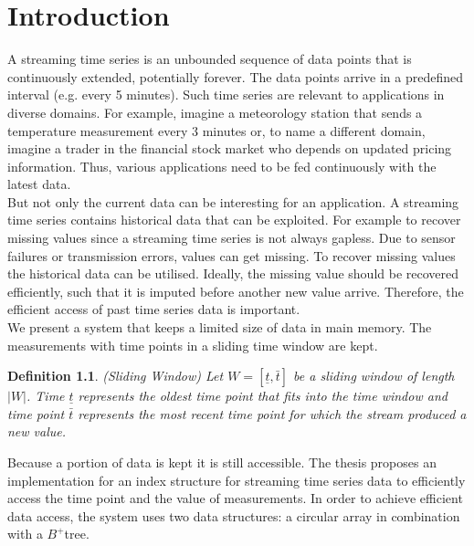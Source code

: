 \documentclass[abstracton,12pt,oneside]{scrreprt}
\begin{document}
\tableofcontents
\listoffigures
\listoftables
\listofalgorithms
\renewcommand{\lstlistingname}{Algorithm}%
\renewcommand{\listtablename}{Tables}


\newtheorem{defn}{Definition}
\newtheorem{exmp}{Example}[section]
\newcommand*{\argmin}{\operatornamewithlimits{argmin}\limits}

\chapter{Introduction}
A streaming time series is an unbounded sequence of data points that is continuously extended, potentially forever. The data points arrive in a predefined interval (e.g. every 5 minutes). Such time series are relevant to applications in diverse domains. For example, imagine a meteorology station that sends a temperature measurement every 3 minutes or, to name a different domain, imagine a trader in the financial stock market who depends on updated pricing information. Thus, various applications need to be fed continuously with the latest data. \\
But not only the current data can be interesting for an application. A streaming time series contains historical data that can be exploited. For example to recover missing values since a streaming time series is not always gapless. Due to sensor failures or transmission errors, values can get missing. To recover missing values the historical data can be utilised. Ideally, the missing value should be recovered efficiently, such that it is imputed before another new value arrive. Therefore, the efficient access of past time series data is important. \\
We present a system that keeps a limited size of data in main memory. The measurements with time points in a sliding time window are kept.  
\begin{defn}
	(Sliding Window) Let $W=[ \underline{t}, \bar{t} ]$ be a sliding window of length $|W|$. Time $\underline{t}$ represents the oldest time point that fits into the time window and time point $\bar{t}$ represents the most recent time point for which the stream produced a new value. 
\end{defn}
Because a portion of data is kept it is still accessible. The thesis proposes an implementation for an index structure for streaming time series data to efficiently access the time point and the value of measurements. In order to achieve efficient data access, the system uses two data structures: a circular array in combination with a $B^+$tree. 
\end{document}
